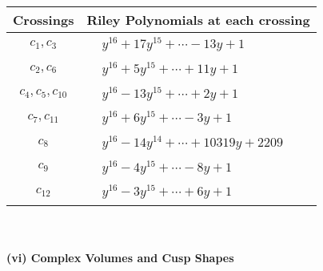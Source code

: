 \documentclass[1p]{elsarticle_modified}
\theoremstyle{definition}
\begin{document}
\begin{tabular}{m{50pt}|m{274pt}}
Crossings & \hspace{64pt}Riley Polynomials at each crossing \\
\hline $$\begin{aligned}c_{1},c_{3}\end{aligned}$$&$\begin{aligned}
&y^{16}+17 y^{15}+\cdots-13 y+1
\end{aligned}$\\
\hline $$\begin{aligned}c_{2},c_{6}\end{aligned}$$&$\begin{aligned}
&y^{16}+5 y^{15}+\cdots+11 y+1
\end{aligned}$\\
\hline $$\begin{aligned}c_{4},c_{5},c_{10}\end{aligned}$$&$\begin{aligned}
&y^{16}-13 y^{15}+\cdots+2 y+1
\end{aligned}$\\
\hline $$\begin{aligned}c_{7},c_{11}\end{aligned}$$&$\begin{aligned}
&y^{16}+6 y^{15}+\cdots-3 y+1
\end{aligned}$\\
\hline $$\begin{aligned}c_{8}\end{aligned}$$&$\begin{aligned}
&y^{16}-14 y^{14}+\cdots+10319 y+2209
\end{aligned}$\\
\hline $$\begin{aligned}c_{9}\end{aligned}$$&$\begin{aligned}
&y^{16}-4 y^{15}+\cdots-8 y+1
\end{aligned}$\\
\hline $$\begin{aligned}c_{12}\end{aligned}$$&$\begin{aligned}
&y^{16}-3 y^{15}+\cdots+6 y+1
\end{aligned}$\\
\hline
\end{tabular}\\~\\
\newpage\flushleft \textbf{(vi) Complex Volumes and Cusp Shapes}
\end{document}
